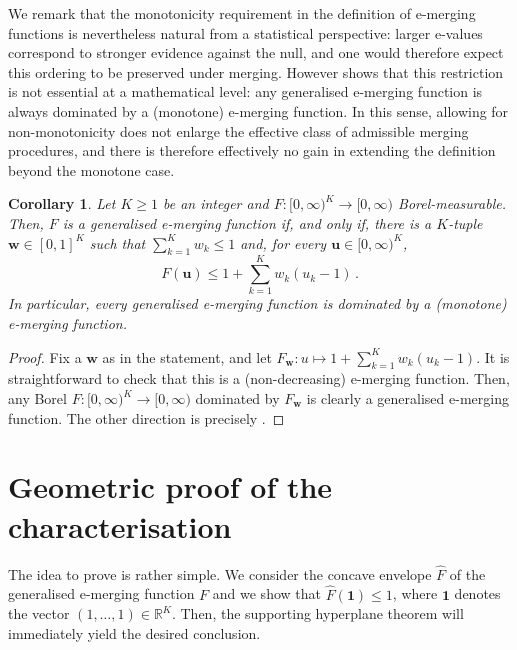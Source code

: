 \documentclass[3p, authoryear, 10pt]{elsarticle}%
\newtheorem{corollary}{Corollary}
\newcommand{\one}{\mathbf{1}}
\newcommand{\R}{\mathbb R}
\begin{document}
We remark that the monotonicity requirement in the definition of e-merging functions is nevertheless natural from a statistical perspective: larger e-values correspond to stronger evidence against the null, and one would therefore expect this ordering to be preserved under merging. However  shows that this restriction is not essential at a mathematical level: any generalised e-merging function is always dominated by a (monotone) e-merging function. In this sense, allowing for non-monotonicity does not enlarge the effective class of admissible merging procedures, and there is therefore effectively no  gain in extending the definition beyond the monotone case.

\begin{corollary}
    Let $K\geq 1$ be an integer and $F:[0,\infty)^K\to[0,\infty)$ Borel-measurable. Then, $F$ is a generalised e-merging function if, and only if, there is a $K$-tuple $\mathbf w \in [0,1]^K$ such that $\sum_{k=1}^K w_k\leq 1$ and, for every $\mathbf u\in [0,\infty)^K$,
    $$F(\mathbf u) \leq 1 + \sum_{k=1}^K w_k(u_k-1)\,.$$
    In particular, every generalised e-merging function is dominated by a (monotone) e-merging function.
\end{corollary}
\begin{proof}
    Fix a $\mathbf w$ as in the statement, and let $F_{\mathbf{w}}:u\mapsto 1 + \sum_{k=1}^K w_k(u_k-1)$. It is straightforward to check that this is a (non-decreasing) e-merging function. Then, any Borel $F:[0,\infty)^K\to[0,\infty)$ dominated by $F_{\mathbf{w}}$ is clearly a generalised e-merging function. The other direction is precisely .
\end{proof}

\section{Geometric proof of the characterisation}
The idea to prove  is rather simple. We consider the concave envelope $\hat F$ of the generalised e-merging function $F$ and we show that $\hat F(\one) \leq 1$, where $\one$ denotes the vector 
$(1,\dots,1)\in\R^K$. Then, the supporting hyperplane  theorem will immediately yield the desired conclusion.
\end{document}
